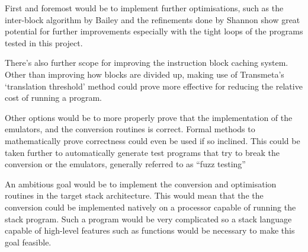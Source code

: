 First and foremost would be to implement further optimisations, such as the
inter-block algorithm by Bailey and the refinements done by Shannon show great
potential for further improvements especially with the tight loops of the
programs tested in this project.

There's also further scope for improving the instruction block caching system.
Other than improving how blocks are divided up, making use of Transmeta's
`translation threshold' method could prove more effective for reducing the
relative cost of running a program.

Other options would be to more properly prove that the implementation of the
emulators, and the conversion routines is correct. Formal methods to
mathematically prove correctness could even be used if so inclined. This could
be taken further to automatically generate test programs that try to break the
conversion or the emulators, generally referred to as ``fuzz testing''

An ambitious goal would be to implement the conversion and optimisation routines
in the target stack architecture. This would mean that the the conversion could
be implemented natively on a processor capable of running the stack program.
Such a program would be very complicated so a stack language capable of
high-level features such as functions would be necessary to make this goal
feasible.
